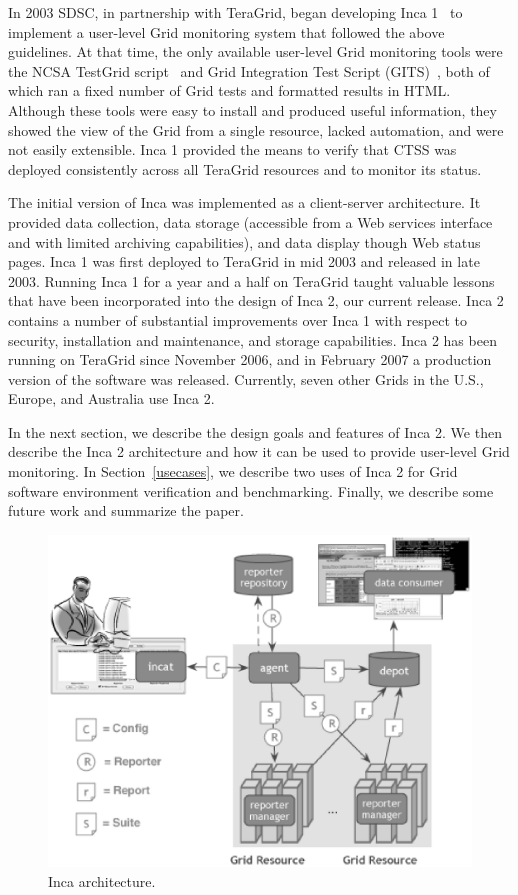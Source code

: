 \documentclass[times,10pt,twocolumn]{article}
\begin{document}

\noindent In 2003 SDSC, in partnership with TeraGrid, began developing Inca
1~\cite{inca1} to implement a user-level Grid monitoring system that followed
the above guidelines.  At that time, the only available user-level Grid
monitoring tools were the NCSA TestGrid script~\cite{ncsa-test} and
Grid Integration Test Script (GITS)~\cite{gits}, both of which ran a fixed number of Grid tests and formatted
results in HTML.  Although these tools were easy to install and produced
useful information, they showed the view of the Grid from a single
resource, lacked automation, and were not easily extensible.  Inca 1 provided
the means to verify that CTSS was deployed consistently across all TeraGrid
resources and to monitor its status.

The initial
version of Inca was implemented as a client-server architecture.  It provided
data collection, data storage (accessible from a Web services interface and with 
limited archiving capabilities), and data display though Web status
pages.  Inca 1 was first deployed to TeraGrid in mid 2003 and released in late
2003. Running Inca 1 for a year and a half on TeraGrid taught 
valuable lessons that have been incorporated into the design of Inca 2, our
current release.  Inca 2
contains a number of substantial improvements over Inca 1 with respect to
security, installation and maintenance, and storage capabilities.  Inca 2 has
been running on TeraGrid since November 2006, and in February 2007 a production
version of the software was released.  Currently, seven other Grids in the
U.S., Europe, and Australia use Inca 2.  

In the next section, we describe the design goals and features of Inca 2. 
We then describe the Inca 2 architecture and how it can be used to provide
user-level Grid monitoring.  In Section~\ref{usecases}, we describe two 
uses of Inca 2 for Grid software environment verification and benchmarking.  
Finally, we describe some future work and summarize the paper.

  
\begin{figure}[tbp]
  \centering
  \includegraphics[width=.6\textwidth]{arch.eps}
  \caption{\label{arch_fig} Inca architecture.}
\end{figure}
\end{document}
